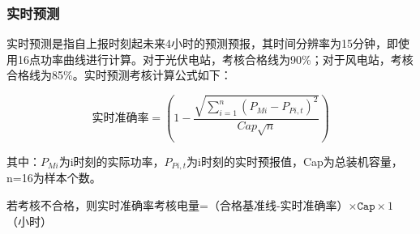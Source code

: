 \documentclass[winfonts,UTF8,a4paper]{ctexart}
\begin{document}
\subsubsection{实时预测}
实时预测是指自上报时刻起未来4小时的预测预报，其时间分辨率为15分钟，即使用16点功率曲线进行计算。对于光伏电站，考核合格线为90\%；对于风电站，考核合格线为85\%。实时预测考核计算公式如下：

%	
\begin{equation}\label{pre_wind_rt}
	\texttt{实时准确率}=(1-\dfrac{\sqrt{\sum\limits_{i=1}^{n}(P_{Mi}-P_{Pi,t})^2}}{Cap\sqrt{n}})
\end{equation}

其中：$ P_{Mi} $为i时刻的实际功率，$ P_{Pi,t} $为i时刻的实时预报值，Cap为总装机容量，n=16为样本个数。

若考核不合格，则实时准确率考核电量=（合格基准线-实时准确率）$ \times \texttt{Cap}\times 1 $（小时）
\end{document}
